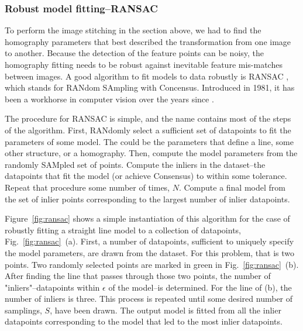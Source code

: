 
\subsubsection{Robust model fitting--RANSAC}
To perform the image stitching in the section above, we had to find the homography parameters that best described the transformation from one image to another. Because the detection of the feature points can be noisy, the homography fitting needs to be robust against inevitable feature mis-matches between images.  A good algorithm to fit models to data robustly is  RANSAC \cite{Fischler1981}, which stands for RANdom SAmpling with Concensus.  Introduced in 1981, it has been a workhorse in computer vision over the years since \cite{Zisserman2006}.

The procedure for RANSAC is simple, and the name contains most of the steps of the algorithm.  First, RANdomly select a sufficient set of datapoints to fit the parameters of some model.  The could be the parameters that define a line, some other structure, or a homography.  Then, compute the model parameters from the randomly SAMpled set of points. Compute the inliers in the dataset--the datapoints that fit the model (or achieve Consensus) to within some tolerance.  Repeat that procedure some number of times, $N$.    Compute a final model from the set of inlier points corresponding to the largest number of inlier datapoints.

Figure~\ref{fig:ransac} shows a simple instantiation of this algorithm for the case of robustly fitting a straight line model to a collection of datapoints, Fig.~\ref{fig:ransac}~(a).  First, a number of datapoints, sufficient to uniquely specify the model parameters, are drawn from the dataset.  For this problem, that is two points.  Two randomly selected points are marked in green in Fig.~\ref{fig:ransac}~(b).  After finding the line that passes through those two points, the number of "inliers"--datapoints within $\epsilon$ of the model--is determined.  For the line of (b), the number of inliers is three. This process is repeated until some desired number of samplings, $S$, have been drawn.  The output model is fitted from all the inlier datapoints corresponding to the model that led to the most inlier datapoints.

